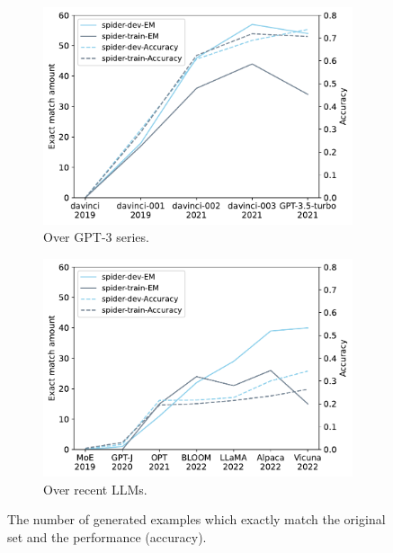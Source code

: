 \documentclass[letterpaper]{article} %
\newcommand{\cm}[1]{}  %
\newcommand{\jmfb}[1]{}      %
\begin{document}
\begin{figure}[t!]
          \centering
          \begin{subfigure}[b]{0.475\textwidth}
            \includegraphics[scale=0.5]{img/output-spider.pdf}
            \caption[]%
            {{Over GPT-3 series.}}
            \label{fig:spider}
            \end{subfigure}
        \hfill
        \centering
        \begin{subfigure}[b]{0.475\textwidth}
            \includegraphics[scale=0.5]{img/output-spider-recent-llm.pdf}
            \caption[]%
            {{Over recent LLMs.\jmfb{Let's try to explain why Vicuna drops on dev-EM, and not on train-EM, also when compared to Alpaca.}}}
            \label{fig:spider-2}
        \end{subfigure}
    \caption[]%
            {{The number of generated examples which exactly match the original set and the performance (accuracy).\jmfb{is this with schema, or without schema?,\cm{EM scores without schema, accuracy scores with schema}}}}
            \label{fig:spider-both}
\end{figure}
\end{document}
